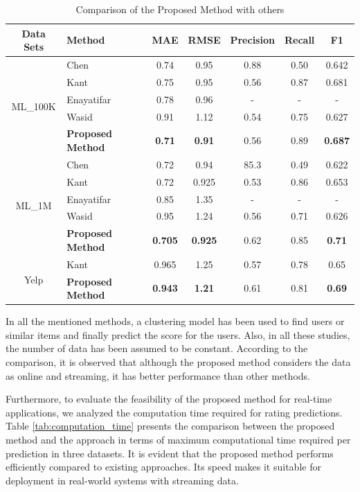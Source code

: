 \documentclass{article}
\begin{document}
\begin{table}[htbp]
\centering
\caption{Comparison of the Proposed Method with others}
\label{tab:comparison_results}
\renewcommand{\arraystretch}{1.3}
\setlength{\tabcolsep}{3pt}
\begin{tabular}{clccccc}
\hline
\textbf{Data Sets} & \textbf{Method} & \textbf{MAE} & \textbf{RMSE} & \textbf{Precision} & \textbf{Recall} & \textbf{F1} \\
\hline
\multirow{5}{*}{ML\_100K} & Chen\cite{liji2018improved} & 0.74 & 0.95 & 0.88 & 0.50 & 0.642 \\
& Kant\cite{kant2017leaderrank} & 0.75 & 0.95 & 0.56 & 0.87 & 0.681 \\
& Enayatifar \cite{mohammadpour2019efficient} & 0.78 & 0.96 & - & - & - \\
& Wasid \cite{wasid2018clustering} & 0.91 & 1.12 & 0.54 & 0.75 & 0.627 \\
& \textbf{Proposed Method} & \textbf{0.71} & \textbf{0.91} & 0.56 & 0.89 & \textbf{0.687} \\
\hline
\multirow{5}{*}{ML\_1M} & Chen & 0.72 & 0.94 & 85.3 & 0.49 & 0.622 \\
& Kant & 0.72 & 0.925 & 0.53 & 0.86 & 0.653 \\
& Enayatifar & 0.85 & 1.35 & - & - & - \\
& Wasid & 0.95 & 1.24 & 0.56 & 0.71 & 0.626 \\
& \textbf{Proposed Method} & \textbf{0.705} & \textbf{0.925} & 0.62 & 0.85 & \textbf{0.71} \\
\hline
\multirow{3}{*}{Yelp} & Kant & 0.965 & 1.25 & 0.57 & 0.78 & 0.65 \\
&  \textbf{Proposed Method} & \textbf{0.943} & \textbf{1.21} & 0.61 & 0.81 & \textbf{0.69} \\
\hline
\end{tabular}
\end{table}

In all the mentioned methods, a clustering model has been used to find users or similar items and finally predict the score for the users. Also, in all these studies, the number of data has been assumed to be constant. According to the comparison, it is observed that although the proposed method considers the data as online and streaming, it has better performance than other methods.

Furthermore, to evaluate the feasibility of the proposed method for real-time applications, we analyzed the computation time required for rating predictions. Table \ref{tab:computation_time} presents the comparison between the proposed method and the approach \cite{kant2017leaderrank} in terms of maximum computational time required per prediction in three datasets. It is evident that the proposed method performs efficiently compared to existing approaches. Its speed makes it suitable for deployment in real-world systems with streaming data.
\end{document}
